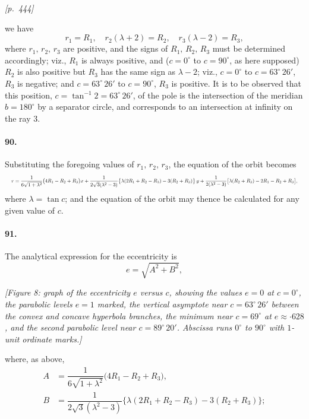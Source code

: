 \documentclass[11pt]{article}
\begin{document}
\medskip
\noindent\textit{[p.~444]}

\medskip

we have
\[
r_{1} = R_{1},\quad r_{2}(\lambda + 2) = R_{2},\quad r_{3}(\lambda - 2) = R_{3},
\]
where $r_{1},\, r_{2},\, r_{3}$ are positive, and the signs of $R_{1},\, R_{2},\, R_{3}$ must be determined accordingly; viz., $R_{1}$ is always positive, and ($c = 0^{\circ}$ to $c = 90^{\circ}$, as here supposed) $R_{2}$ is also positive but $R_{3}$ has the same sign as $\lambda - 2$; viz., $c = 0^{\circ}$ to $c = 63^{\circ}\,26'$, $R_{3}$ is negative; and $c = 63^{\circ}\,26'$ to $c = 90^{\circ}$, $R_{3}$ is positive. It is to be observed that this position, $c = \tan^{-1}2 = 63^{\circ}\,26'$, of the pole is the intersection of the meridian $b = 180^{\circ}$ by a separator circle, and corresponds to an intersection at infinity on the ray $3$.

\paragraph{90.} Substituting the foregoing values of $r_{1},\, r_{2},\, r_{3}$, the equation of the orbit becomes
\[
\resizebox{\textwidth}{!}{$\displaystyle
r = \dfrac{1}{6\sqrt{1 + \lambda^{2}}}\bigl(4R_{1} - R_{2} + R_{3}\bigr)x
+ \dfrac{1}{2\sqrt{3}(\lambda^{2} - 3)}\bigl\{\lambda(2R_{1} + R_{2} - R_{3}) - 3(R_{2} + R_{3})\bigr\}\,y
+ \dfrac{1}{2(\lambda^{2} - 3)}\bigl[\lambda(R_{2} + R_{3}) - 2R_{1} - R_{2} + R_{3}\bigr],
$}
\]
where $\lambda = \tan c$; and the equation of the orbit may thence be calculated for any given value of $c$.

\paragraph{91.} The analytical expression for the eccentricity is
\[
e = \sqrt{A^{2} + B^{2}},
\]
\begin{center}
\textit{[Figure 8: graph of the eccentricity $e$ versus $c$, showing the values $e=0$ at $c=0^{\circ}$, the parabolic levels $e=1$ marked, the vertical asymptote near $c=63^{\circ}\,26'$ between the convex and concave hyperbola branches, the minimum near $c=69^{\circ}$ at $e\approx{\cdot}628$, and the second parabolic level near $c=89^{\circ}\,20'$. Abscissa runs $0^{\circ}$ to $90^{\circ}$ with $1$-unit ordinate marks.]}
\end{center}
where, as above,
\[
\begin{aligned}
A &= \dfrac{1}{6\sqrt{1 + \lambda^{2}}}\bigl(4R_{1} - R_{2} + R_{3}\bigr),\\
B &= \dfrac{1}{2\sqrt{3}(\lambda^{2} - 3)}\bigl\{\lambda(2R_{1} + R_{2} - R_{3}) - 3(R_{2} + R_{3})\bigr\};
\end{aligned}
\]
\end{document}
